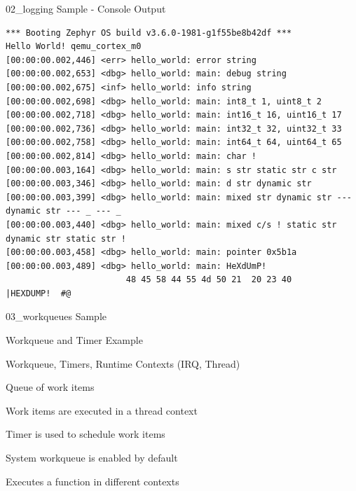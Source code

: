 \documentclass[10pt, aspectratio=169]{beamer}
\begin{document}
\begin{frame}[fragile]{02\_logging Sample - Console Output}
  \begin{listing}[H]
    \begin{verbatim}
*** Booting Zephyr OS build v3.6.0-1981-g1f55be8b42df ***
Hello World! qemu_cortex_m0
[00:00:00.002,446] <err> hello_world: error string
[00:00:00.002,653] <dbg> hello_world: main: debug string
[00:00:00.002,675] <inf> hello_world: info string
[00:00:00.002,698] <dbg> hello_world: main: int8_t 1, uint8_t 2
[00:00:00.002,718] <dbg> hello_world: main: int16_t 16, uint16_t 17
[00:00:00.002,736] <dbg> hello_world: main: int32_t 32, uint32_t 33
[00:00:00.002,758] <dbg> hello_world: main: int64_t 64, uint64_t 65
[00:00:00.002,814] <dbg> hello_world: main: char !
[00:00:00.003,164] <dbg> hello_world: main: s str static str c str
[00:00:00.003,346] <dbg> hello_world: main: d str dynamic str
[00:00:00.003,399] <dbg> hello_world: main: mixed str dynamic str --- dynamic str --- _ --- _
[00:00:00.003,440] <dbg> hello_world: main: mixed c/s ! static str dynamic str static str !
[00:00:00.003,458] <dbg> hello_world: main: pointer 0x5b1a
[00:00:00.003,489] <dbg> hello_world: main: HeXdUmP!
                        48 45 58 44 55 4d 50 21  20 23 40                |HEXDUMP!  #@     

    \end{verbatim}
  \end{listing}
\end{frame}
\begin{frame}[fragile]{03\_workqueues Sample}
      \begin{description}
	\item [Description] Workqueue and Timer Example
	\item [Learn] Workqueue, Timers, Runtime Contexts (IRQ, Thread)
	\item Queue of work items
	\item Work items are executed in a thread context
	\item Timer is used to schedule work items
	\item System workqueue is enabled by default
	\item [Sample] Executes a function in different contexts
      \end{description}
\end{frame}
\end{document}
